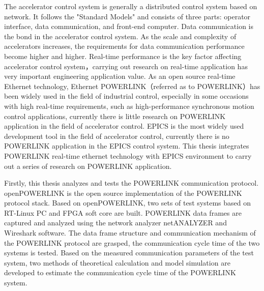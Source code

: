 \begin{enabstract}

The accelerator control system is generally a distributed control system based on network. It follows the "Standard Models" and consists of three parts: operator interface, data communication, and front-end computer. Data communication is the bond in the accelerator control system. As the scale and complexity of accelerators increases, the requirements for data communication performance become higher and higher. Real-time performance is the key factor affecting accelerator control system，carrying out research on real-time application has very important engineering application value. As an open source real-time Ethernet technology, Ethernet POWERLINK（referred as to POWERLINK）has been widely used in the field of industrial control, especially in some occasions with high real-time requirements, such as high-performance synchronous motion control applications, currently there is little research on POWERLINK application in the field of accelerator control. EPICS is the most widely used development tool in the field of accelerator control, currently there is no POWERLINK application in the EPICS control system. This thesis integrates POWERLINK real-time ethernet technology with EPICS environment to carry out a series of research on POWERLINK application.

Firstly, this thesis analyzes and tests the POWERLINK communication protocol. openPOWERLINK is the open source implementation of the POWERLINK protocol stack. Based on openPOWERLINK, two sets of test systems based on RT-Linux PC and FPGA soft core are built. POWERLINK data frames are captured and analyzed using the network analyzer netANALYZER and Wireshark software. The data frame structure and communication mechanism of the POWERLINK protocol are grasped, the communication cycle time of the two systems is tested. Based on the measured communication parameters of the test system, two methods of theoretical calculation and model simulation are developed to estimate the communication cycle time of the POWERLINK system.


\end{enabstract}
